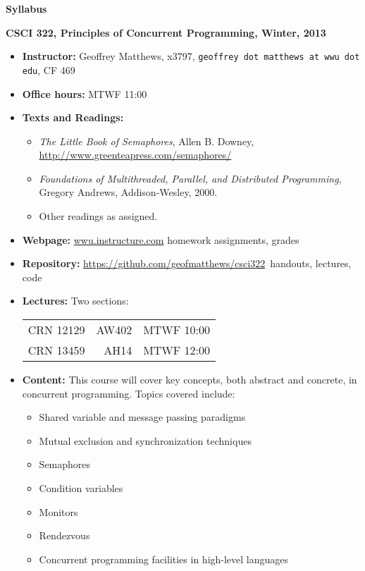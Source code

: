 \documentclass{article}
\begin{document}
\centerline{\large \bf Syllabus}

\centerline{\bf CSCI 322, Principles of Concurrent Programming, Winter, 2013}

\begin{itemize}

\item
{\bf Instructor:} Geoffrey Matthews, x3797, {\tt  geoffrey dot matthews at wwu dot edu}, CF 469
\item
{\bf Office hours:} MTWF 11:00
\item
{\bf Texts and Readings:} 
\begin{itemize}
\item {\em The Little Book of Semaphores}, Allen B. Downey, 
\url{http://www.greenteapress.com/semaphores/}
\item {\em Foundations of Multithreaded, Parallel, and Distributed Programming}, Gregory Andrews, Addison-Wesley, 2000.
\item Other readings as assigned.
\end{itemize}
\item {\bf Webpage:}  \url{wwu.instructure.com}  homework assignments, grades
\item {\bf Repository:} \url{https://github.com/geofmatthews/csci322}\  handouts, lectures, code
\item
{\bf Lectures:} Two sections:
\begin{tabular}{rrr}
CRN 12129 & AW402 & MTWF 10:00\\
CRN 13459 & AH14 & MTWF 12:00\\
\end{tabular}
\item
{\bf Content:}
This course will cover key concepts, both abstract and concrete, in
concurrent programming.  Topics covered include:
\begin{multicols}{2}
\begin{itemize}
\item Shared variable and message passing paradigms
\item Mutual exclusion and synchronization techniques
\item Semaphores 
\item Condition variables
\item Monitors 
\item Rendezvous 
\item Concurrent programming facilities in high-level languages

\end{itemize}
\end{multicols}
\end{itemize}
\end{document}
